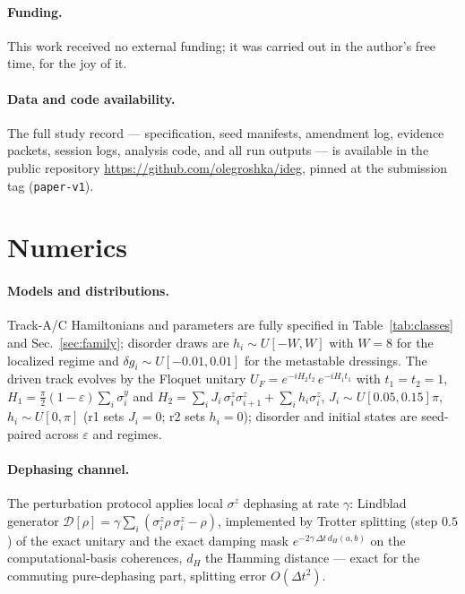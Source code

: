 \documentclass[a4paper,11pt,noarxiv]{quantumarticle}
\begin{document}
\paragraph{Funding.} This work received no external funding; it was
carried out in the author's free time, for the joy of it.

\paragraph{Data and code availability.} The full study record ---
specification, seed manifests, amendment log, evidence packets, session
logs, analysis code, and all run outputs --- is available in the public
repository \url{https://github.com/olegroshka/ideg}, pinned at the
submission tag (\texttt{paper-v1}).

\appendix

\section{Numerics}\label{app:numerics}

\paragraph{Models and distributions.} Track-A/C Hamiltonians and
parameters are fully specified in Table~\ref{tab:classes} and
Sec.~\ref{sec:family}; disorder draws are $h_i \sim U[-W, W]$ with
$W=8$ for the localized regime and $\delta g_i \sim U[-0.01, 0.01]$
for the metastable dressings. The driven track evolves by the Floquet
unitary $U_F = e^{-iH_2 t_2}\, e^{-iH_1 t_1}$ with $t_1 = t_2 = 1$,
$H_1 = \tfrac{\pi}{2}(1-\varepsilon)\sum_i \sigma^y_i$ and
$H_2 = \sum_i J_i\,\sigma^z_i\sigma^z_{i+1} + \sum_i h_i\sigma^z_i$,
$J_i \sim U[0.05, 0.15]\pi$, $h_i \sim U[0, \pi]$ (r1 sets $J_i = 0$;
r2 sets $h_i = 0$); disorder and initial states are seed-paired across
$\varepsilon$ and regimes.

\paragraph{Dephasing channel.} The perturbation protocol applies local
$\sigma^z$ dephasing at rate $\gamma$: Lindblad generator
$\mathcal{D}[\rho] = \gamma\sum_i (\sigma^z_i \rho\, \sigma^z_i -
\rho)$, implemented by Trotter splitting (step $0.5$) of the exact
unitary and the exact damping mask $e^{-2\gamma\,\Delta t\, d_H(a,b)}$
on the computational-basis coherences, $d_H$ the Hamming distance ---
exact for the commuting pure-dephasing part, splitting error
$O(\Delta t^2)$.
\end{document}
